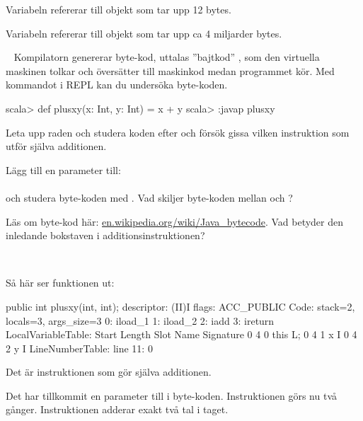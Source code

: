 \SubtaskSolved Variabeln  refererar till objekt som tar upp 12 bytes.

\SubtaskSolved Variabeln  refererar till objekt som tar upp ca 4 miljarder bytes.

\QUESTEND





\QUESTBEGIN

\Task\Uberkurs  \what~  Kompilatorn genererar byte-kod, uttalas ''bajtkod'' , som den virtuella maskinen tolkar och översätter till maskinkod medan programmet kör. Med kommandot  i REPL kan du undersöka byte-koden.
\begin{REPL}
scala> def plusxy(x: Int, y: Int) = x + y
scala> :javap plusxy
\end{REPL}

\Subtask Leta upp raden  och studera koden efter  och försök gissa vilken instruktion som utför själva additionen.

\Subtask Lägg till en parameter till: \\ 
\\ och studera byte-koden med . Vad skiljer byte-koden mellan  och ?

\Subtask Läs om byte-kod här: \href{https://en.wikipedia.org/wiki/Java\_bytecode}{en.wikipedia.org/wiki/Java\_bytecode}. Vad betyder den inledande bokstaven i additionsinstruktionen?


\SOLUTION

\TaskSolved \what~

\SubtaskSolved Så här ser funktionen  ut:
\begin{REPL}
public int plusxy(int, int);
  descriptor: (II)I
  flags: ACC_PUBLIC
  Code:
    stack=2, locals=3, args_size=3
       0: iload_1
       1: iload_2
       2: iadd
       3: ireturn
    LocalVariableTable:
      Start  Length  Slot  Name   Signature
          0       4     0  this   L;
          0       4     1     x   I
          0       4     2     y   I
    LineNumberTable:
      line 11: 0
\end{REPL}
Det är instruktionen  som gör själva additionen.


\SubtaskSolved Det har tillkommit en parameter till i byte-koden. Instruktionen  görs nu två gånger. Instruktionen  adderar exakt två tal i taget.

